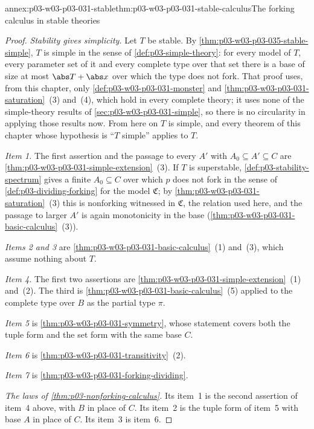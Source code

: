 \begin{annexitem}{annex:p03-w03-p03-031-stable}{thm:p03-w03-p03-031-stable-calculus}{The forking calculus in stable theories}
\begin{proof}
\emph{Stability gives simplicity.}  Let \(T\) be stable.  By
\cref{thm:p03-w03-p03-035-stable-simple}, \(T\) is simple in the sense of
\cref{def:p03-simple-theory}: for every model of \(T\), every parameter set
of it and every complete type over that set there is a base of size at
most \(\abs T+\abs x\) over which the type does not fork.  That proof uses,
from this chapter, only \cref{def:p03-w03-p03-031-monster} and
\cref{thm:p03-w03-p03-031-saturation}~(3) and~(4), which hold in every
complete theory; it uses none of the simple-theory results of
\cref{sec:p03-w03-p03-031-simple}, so there is no circularity in applying
those results now.  From here on \(T\) is simple, and every theorem of this
chapter whose hypothesis is ``\(T\) simple'' applies to \(T\).

\emph{Item 1.}  The first assertion and the passage to every \(A'\) with
\(A_0\subseteq A'\subseteq C\) are
\cref{thm:p03-w03-p03-031-simple-extension}~(3).  If \(T\) is superstable,
\cref{def:p03-stability-spectrum} gives a finite \(A_0\subseteq C\) over
which \(p\) does not fork in the sense of \cref{def:p03-dividing-forking}
for the model \(\mathfrak C\); by \cref{thm:p03-w03-p03-031-saturation}~(3)
this is nonforking witnessed in \(\mathfrak C\), the relation used here, and
the passage to larger \(A'\) is again monotonicity in the base
(\cref{thm:p03-w03-p03-031-basic-calculus}~(3)).

\emph{Items 2 and 3} are \cref{thm:p03-w03-p03-031-basic-calculus}~(1)
and~(3), which assume nothing about \(T\).

\emph{Item 4.}  The first two assertions are
\cref{thm:p03-w03-p03-031-simple-extension}~(1) and~(2).  The third is
\cref{thm:p03-w03-p03-031-basic-calculus}~(5) applied to the complete type
over \(B\) as the partial type \(\pi\).

\emph{Item 5} is \cref{thm:p03-w03-p03-031-symmetry}, whose statement
covers both the tuple form and the set form with the same base \(C\).

\emph{Item 6} is \cref{thm:p03-w03-p03-031-transitivity}~(2).

\emph{Item 7} is \cref{thm:p03-w03-p03-031-forking-dividing}.

\emph{The laws of \cref{thm:p03-nonforking-calculus}.}  Its item~1 is the
second assertion of item~4 above, with \(B\) in place of \(C\).  Its
item~2 is the tuple form of item~5 with base \(A\) in place of \(C\).  Its
item~3 is item~6.
\end{proof}
\end{annexitem}


